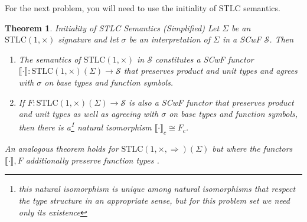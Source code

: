\documentclass[12pt]{article}
\newtheorem{theorem}{Theorem}
\newcommand{\cat}{\mathcal}
\newcommand{\stlccart}{\mathrm{STLC}(1,\times)}
\newcommand{\stlcccc}{\mathrm{STLC}(1,\times,\Rightarrow)}
\newcommand{\sem}[1]{\llbracket\cdot\rrbracket}
\begin{document}
For the next problem, you will need to use the initiality of STLC
semantics.
\begin{theorem}{Initiality of STLC Semantics (Simplified)}
  Let $\Sigma$ be an $\stlccart$ signature and let $\sigma$ be an
  interpretation of $\Sigma$ in a SCwF $\cat S$. Then
  \begin{enumerate}
  \item The semantics of $\stlccart$ in $\cat S$ constitutes a SCwF functor
    $\sem{\cdot} : \stlccart(\Sigma) \to \cat S$ that
    preserves product and unit types and agrees with $\sigma$ on base
    types and function symbols.
  \item If $F : \stlccart(\Sigma) \to \cat S$ is also a SCwF functor
    that preserves product and unit types as well as agreeing with
    $\sigma$ on base types and function symbols, then there is
    a\footnote{this natural isomorphism is unique among natural
    isomorphisms that respect the type structure in an appropriate
    sense, but for this problem set we need only its existence}
    natural isomorphism $\sem{\cdot}_c \cong F_c$.
  \end{enumerate}

  An analogous theorem holds for $\stlcccc(\Sigma)$ but where the
  functors $\sem{\cdot}, F$ additionally preserve function types .
\end{theorem}
\end{document}
